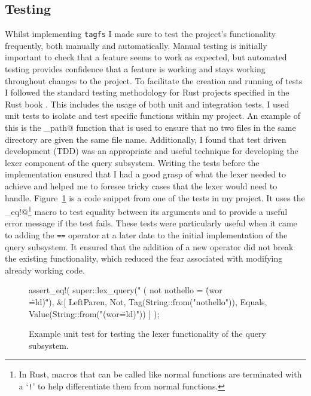 \subsection{Testing}
\label{sec:testing}

Whilst implementing \texttt{tagfs} I made sure to test the project's
functionality frequently, both manually and automatically. Manual testing is
initially important to check that a feature seems to work as expected, but
automated testing provides confidence that a feature is working and stays
working throughout changes to the project. To facilitate the creation and
running of tests I followed the standard testing methodology for Rust projects
specified in the Rust book \cite{rust-testing}. This includes the usage of both
unit and integration tests. I used unit tests to isolate and test specific
functions within my project. An example of this is the \verb@sanitise_path@
function that is used to ensure that no two files in the same directory are
given the same file name. Additionally, I found that test driven development
(TDD) was an appropriate and useful technique for developing the lexer
component of the query subsystem. Writing the tests before the implementation
ensured that I had a good grasp of what the lexer needed to achieve and helped
me to foresee tricky cases that the lexer would need to handle.
Figure~\ref{fig:example-unit-test} is a code snippet from one of the tests in
my project. It uses the \verb@assert_eq!@\footnote{In Rust, macros that can be
called like normal functions are terminated with a `\texttt{!}' to help
differentiate them from normal functions.} macro to test equality between its
arguments and to provide a useful error message if the test fails. These tests
were particularly useful when it came to adding the \texttt{==} operator at a
later date to the initial implementation of the query subsystem. It ensured
that the addition of a new operator did not break the existing functionality,
which reduced the fear associated with modifying already working code.

\begin{figure}
    \centering
    \begin{boxedverbatim}
assert_eq!(
    super::lex_query("      (     not nothello   = \"(wor\\\"=ld)\""),
    &[
        LeftParen, Not, Tag(String::from("nothello")), Equals,
        Value(String::from("(wor\"=ld)"))
    ]
);
    \end{boxedverbatim}
    \caption[Example unit test]{Example unit test for testing the lexer
        functionality of the query subsystem.}
    \label{fig:example-unit-test}
\end{figure}

